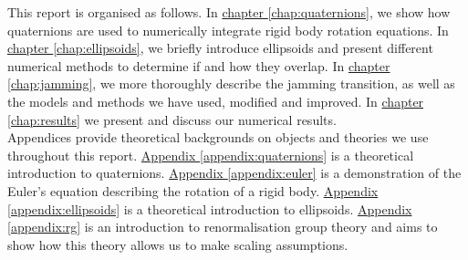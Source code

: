 \documentclass[class=report, float=false, crop=false]{standalone}
\begin{document}
This report is organised as follows. In \hyperref[chap:quaternions]{chapter \ref{chap:quaternions}}, we show how quaternions are used to numerically integrate rigid body rotation equations. In \hyperref[chap:ellipsoids]{chapter \ref{chap:ellipsoids}}, we briefly introduce ellipsoids and present different numerical methods to determine if and how they overlap. In \hyperref[chap:jamming]{chapter \ref{chap:jamming}}, we more thoroughly describe the jamming transition, as well as the models and methods we have used, modified and improved. In \hyperref[chap:results]{chapter \ref{chap:results}} we present and discuss our numerical results.\\

Appendices provide theoretical backgrounds on objects and theories we use throughout this report. \hyperref[appendix:quaternions]{Appendix \ref{appendix:quaternions}} is a theoretical introduction to quaternions. \hyperref[appendix:euler]{Appendix \ref{appendix:euler}} is a demonstration of the Euler's equation describing the rotation of a rigid body. \hyperref[appendix:ellipsoids]{Appendix \ref{appendix:ellipsoids}} is a theoretical introduction to ellipsoids. \hyperref[appendix:rg]{Appendix \ref{appendix:rg}} is an introduction to renormalisation group theory and aims to show how this theory allows us to make scaling assumptions.

% 
\end{document}
